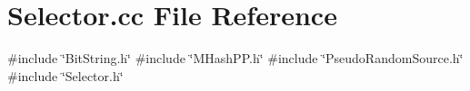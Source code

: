 \section{Selector.\+cc File Reference}
\label{Selector_8cc}
{\ttfamily \#include \char`\"{}Bit\+String.\+h\char`\"{}}\newline
{\ttfamily \#include \char`\"{}M\+Hash\+P\+P.\+h\char`\"{}}\newline
{\ttfamily \#include \char`\"{}Pseudo\+Random\+Source.\+h\char`\"{}}\newline
{\ttfamily \#include \char`\"{}Selector.\+h\char`\"{}}\newline
